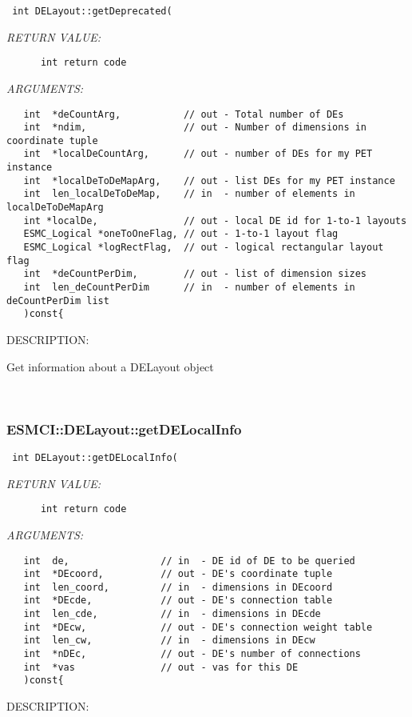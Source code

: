   
\begin{verbatim} int DELayout::getDeprecated(\end{verbatim}{\em RETURN VALUE:}
\begin{verbatim}      int return code\end{verbatim}{\em ARGUMENTS:}
\begin{verbatim}   int  *deCountArg,           // out - Total number of DEs
   int  *ndim,                 // out - Number of dimensions in coordinate tuple
   int  *localDeCountArg,      // out - number of DEs for my PET instance
   int  *localDeToDeMapArg,    // out - list DEs for my PET instance
   int  len_localDeToDeMap,    // in  - number of elements in localDeToDeMapArg
   int *localDe,               // out - local DE id for 1-to-1 layouts
   ESMC_Logical *oneToOneFlag, // out - 1-to-1 layout flag
   ESMC_Logical *logRectFlag,  // out - logical rectangular layout flag
   int  *deCountPerDim,        // out - list of dimension sizes
   int  len_deCountPerDim      // in  - number of elements in deCountPerDim list
   )const{\end{verbatim}
{\sf DESCRIPTION:\\ }


      Get information about a DELayout object
   
 
\mbox{}\hrulefill\
 
\subsubsection [ESMCI::DELayout::getDELocalInfo] {ESMCI::DELayout::getDELocalInfo}


  
\begin{verbatim} int DELayout::getDELocalInfo(\end{verbatim}{\em RETURN VALUE:}
\begin{verbatim}      int return code\end{verbatim}{\em ARGUMENTS:}
\begin{verbatim}   int  de,                // in  - DE id of DE to be queried
   int  *DEcoord,          // out - DE's coordinate tuple
   int  len_coord,         // in  - dimensions in DEcoord
   int  *DEcde,            // out - DE's connection table
   int  len_cde,           // in  - dimensions in DEcde
   int  *DEcw,             // out - DE's connection weight table
   int  len_cw,            // in  - dimensions in DEcw
   int  *nDEc,             // out - DE's number of connections
   int  *vas               // out - vas for this DE
   )const{\end{verbatim}
{\sf DESCRIPTION:\\ }


